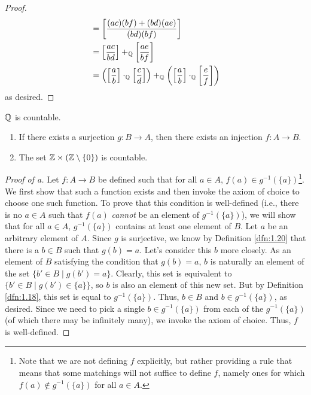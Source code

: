 \documentclass[../main.tex]{subfiles}
\begin{document}
\begin{theorem}
\begin{enumerate}[label={\alph*\textup{)}},ref={\thetheorem\alph*}]
\begin{proof}
\begin{align*}
                &= \left[ \frac{(ac)(bf)+(bd)(ae)}{(bd)(bf)} \right]\\
                &= \left[ \frac{ac}{bd} \right]+_{\mathbb{Q}}\left[ \frac{ae}{bf} \right]\\
                &= \left( \left[ \frac{a}{b} \right]\cdot_{\mathbb{Q}}\left[ \frac{c}{d} \right] \right)+_{\mathbb{Q}}\left( \left[ \frac{a}{b} \right]\cdot_{\mathbb{Q}}\left[ \frac{e}{f} \right] \right)
            \end{align*}
            as desired.
        \end{proof}
    \end{enumerate}
\end{theorem}

\begin{theorem}\label{trm:2.11}
    $\mathbb{Q}$ is countable.
    \begin{lemma*}\leavevmode
        \begin{enumerate}[label={\alph*\textup{)}}]
            \item If there exists a surjection $g:B\to A$, then there exists an injection $f:A\to B$.
            \item The set $\mathbb{Z}\times(\mathbb{Z}\setminus\{0\})$ is countable.
        \end{enumerate}
        \begin{proof}[Proof of a]
            Let $f:A\to B$ be defined such that for all $a\in A$, $f(a)\in g^{-1}(\{a\})$\footnote{Note that we are not defining $f$ explicitly, but rather providing a rule that means that some matchings will not suffice to define $f$, namely ones for which $f(a)\notin g^{-1}(\{a\})$ for all $a\in A$.}. We first show that such a function exists and then invoke the axiom of choice to choose one such function. To prove that this condition is well-defined (i.e., there is no $a\in A$ such that $f(a)$ \emph{cannot} be an element of $g^{-1}(\{a\})$), we will show that for all $a\in A$, $g^{-1}(\{a\})$ contains at least one element of $B$. Let $a$ be an arbitrary element of $A$. Since $g$ is surjective, we know by Definition \ref{dfn:1.20} that there is a $b\in B$ such that $g(b)=a$. Let's consider this $b$ more closely. As an element of $B$ satisfying the condition that $g(b)=a$, $b$ is naturally an element of the set $\{b'\in B\mid g(b')=a\}$. Clearly, this set is equivalent to $\{b'\in B\mid g(b')\in\{a\}\}$, so $b$ is also an element of this new set. But by Definition \ref{dfn:1.18}, this set is equal to $g^{-1}(\{a\})$. Thus, $b\in B$ and $b\in g^{-1}(\{a\})$, as desired. Since we need to pick a single $b\in g^{-1}(\{a\})$ from each of the $g^{-1}(\{a\})$ (of which there may be infinitely many), we invoke the axiom of choice. Thus, $f$ is well-defined.\par

\end{proof}
\end{lemma*}
\end{theorem}
\end{document}
